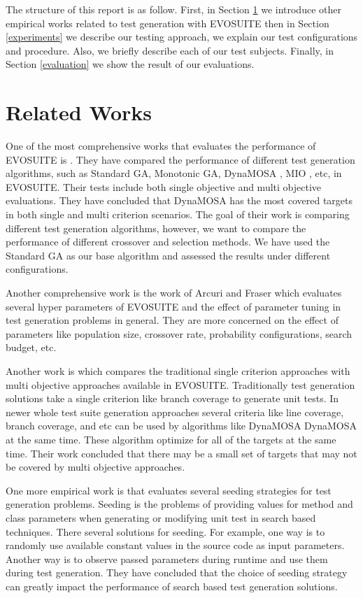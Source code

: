 \documentclass[sigconf]{acmart}
\begin{document}
The structure of this report is as follow. First, in Section \ref{relatedworks} we introduce other
empirical works related to test generation with EVOSUITE then in Section \ref{experiments} we describe
our testing approach, we explain our test configurations and procedure. Also, we briefly describe each of
our test subjects. Finally, in Section \ref{evaluation} we show the result of our evaluations.

\section{Related Works}
\label{relatedworks}
One of the most comprehensive works that evaluates the performance of EVOSUITE is \cite{CAMPOS2018207}. They have
compared the performance of different test generation algorithms, such as Standard GA, Monotonic GA, 
DynaMOSA \cite{7840029}, MIO \cite{Arcuri_2017}, etc, in EVOSUITE. 
Their tests include both single objective and multi objective evaluations. They have concluded that
DynaMOSA has the most covered targets in both single and multi criterion scenarios. The goal of their work is
comparing different test generation algorithms, however, we want to compare the performance of different crossover
and selection methods. We have used the Standard GA as our base algorithm and assessed the results under different
configurations.

Another comprehensive work is the work of Arcuri and Fraser \cite{Tuning13} which evaluates several 
hyper parameters of EVOSUITE and the effect of parameter tuning in test generation problems in general.
They are more concerned on the effect of parameters like population size, crossover rate, probability
configurations, search budget, etc. 

Another work is \cite{emse16_effectiveness} which compares the traditional single criterion approaches
with multi objective approaches available in EVOSUITE. Traditionally test generation solutions take
a single criterion like branch coverage to generate unit tests. In newer whole test suite generation 
approaches several criteria like line coverage, branch coverage, and etc can be used by algorithms 
like DynaMOSA DynaMOSA \cite{7840029} at the same time. 
These algorithm optimize for all of the targets at the same time. Their work concluded
that there may be a small set of targets that may not be covered by multi objective approaches.

One more empirical work is \cite{STVR_seeding} that evaluates several seeding strategies for test generation
problems. Seeding is the problems of providing values for method and class parameters when generating or
modifying unit test in search based techniques. There several solutions for seeding. For example, 
one way is to randomly use available constant values in the source code as input parameters.
Another way is to observe passed parameters during runtime and use them during test generation. They have concluded 
that the choice of seeding strategy can greatly impact the performance of search based test generation solutions.
\end{document}

